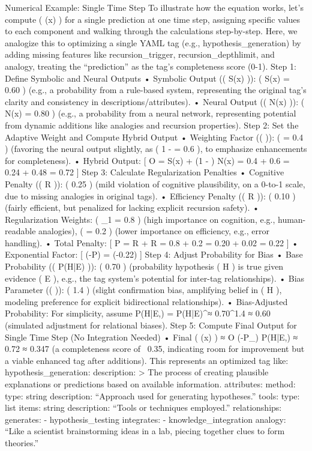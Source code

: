 Numerical Example: Single Time Step To illustrate how the equation works, let’s compute ( \Psi(x) ) for a single prediction at one time step, assigning specific values to each component and walking through the calculations step-by-step. Here, we analogize this to optimizing a single YAML tag (e.g., hypothesis_generation) by adding missing features like recursion_trigger, recursion_depthlimit, and analogy, treating the “prediction” as the tag’s completeness score (0-1). Step 1: Define Symbolic and Neural Outputs • Symbolic Output (( S(x) )): ( S(x) = 0.60 ) (e.g., a probability from a rule-based system, representing the original tag’s clarity and consistency in descriptions/attributes). • Neural Output (( N(x) )): ( N(x) = 0.80 ) (e.g., a probability from a neural network, representing potential from dynamic additions like analogies and recursion properties). Step 2: Set the Adaptive Weight and Compute Hybrid Output • Weighting Factor (( \alpha )): ( \alpha = 0.4 ) (favoring the neural output slightly, as ( 1 - \alpha = 0.6 ), to emphasize enhancements for completeness). • Hybrid Output: [ O{} = \alpha \cdot S(x) + (1 - \alpha) \cdot N(x) = 0.4  + 0.6  = 0.24 + 0.48 = 0.72 ] Step 3: Calculate Regularization Penalties • Cognitive Penalty (( R{} )): ( 0.25 ) (mild violation of cognitive plausibility, on a 0-to-1 scale, due to missing analogies in original tags). • Efficiency Penalty (( R{} )): ( 0.10 ) (fairly efficient, but penalized for lacking explicit recursion safety). • Regularization Weights: ( \lambda_1 = 0.8 ) (high importance on cognition, e.g., human-readable analogies), (  = 0.2 ) (lower importance on efficiency, e.g., error handling). • Total Penalty: [ P{} =  R{} +  R{} = 0.8  + 0.2  = 0.20 + 0.02 = 0.22 ] • Exponential Factor: [ \exp(-P{}) = \exp(-0.22)  ] Step 4: Adjust Probability for Bias • Base Probability (( P(H|E) )): ( 0.70 ) (probability hypothesis ( H ) is true given evidence ( E ), e.g., the tag system’s potential for inter-tag relationships). • Bias Parameter (( \beta )): ( 1.4 ) (slight confirmation bias, amplifying belief in ( H ), modeling preference for explicit bidirectional relationships). • Bias-Adjusted Probability: For simplicity, assume P(H|E,\beta) = P(H|E)^\beta ≈ 0.70^{1.4} ≈ 0.60 (simulated adjustment for relational biases). Step 5: Compute Final Output for Single Time Step (No Integration Needed) • Final ( \Psi(x) ) ≈ O{} \times \exp(-P_{}) \times P(H|E,\beta) ≈ 0.72   ≈ 0.347 (a completeness score of ~0.35, indicating room for improvement but a viable enhanced tag after additions). This represents an optimized tag like: hypothesis_generation: description: > The process of creating plausible explanations or predictions based on available information. attributes: method: type: string description: “Approach used for generating hypotheses.” tools: type: list items: string description: “Tools or techniques employed.” relationships: generates: - hypothesis_testing integrates: - knowledge_integration analogy: “Like a scientist brainstorming ideas in a lab, piecing together clues to form theories.” 